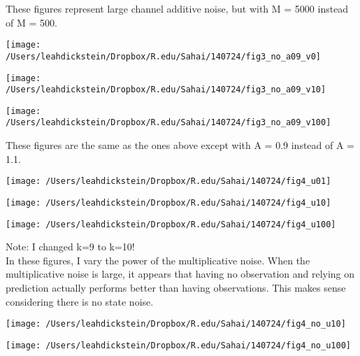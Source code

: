 \documentclass[leqno,twocolumn]{article}
\begin{document}
These figures represent large channel additive noise, but with M = 5000 instead of M = 500.

\begin{minipage}[c]{0.5\textwidth}
\texttt{[image: /Users/leahdickstein/Dropbox/R.edu/Sahai/140724/fig3\_no\_a09\_v0]}
\end{minipage}
\begin{minipage}[c]{0.5\textwidth}
\texttt{[image: /Users/leahdickstein/Dropbox/R.edu/Sahai/140724/fig3\_no\_a09\_v10]}
\end{minipage}

\begin{minipage}[c]{0.5\textwidth}
\texttt{[image: /Users/leahdickstein/Dropbox/R.edu/Sahai/140724/fig3\_no\_a09\_v100]}
\end{minipage}
\begin{minipage}[b]{0.5\textwidth}
These figures are the same as the ones above except with A = 0.9 instead of A = 1.1.
\end{minipage}

\begin{minipage}[c]{0.5\textwidth}
\texttt{[image: /Users/leahdickstein/Dropbox/R.edu/Sahai/140724/fig4\_u01]}
\end{minipage}
\begin{minipage}[c]{0.5\textwidth}
\texttt{[image: /Users/leahdickstein/Dropbox/R.edu/Sahai/140724/fig4\_u10]}
\end{minipage}

\begin{minipage}[c]{0.5\textwidth}
\texttt{[image: /Users/leahdickstein/Dropbox/R.edu/Sahai/140724/fig4\_u100]}
\end{minipage}
\begin{minipage}[b]{0.5\textwidth}
Note: I changed k=9 to k=10!\\

In these figures, I vary the power of the multiplicative noise. When the multiplicative noise is large, it appears that having no observation and relying on prediction actually performs better than having observations. This makes sense considering there is no state noise.
\end{minipage}

\begin{minipage}[c]{0.5\textwidth}
\texttt{[image: /Users/leahdickstein/Dropbox/R.edu/Sahai/140724/fig4\_no\_u10]}
\end{minipage}
\begin{minipage}[c]{0.5\textwidth}
\texttt{[image: /Users/leahdickstein/Dropbox/R.edu/Sahai/140724/fig4\_no\_u100]}
\end{minipage}
\end{document}
